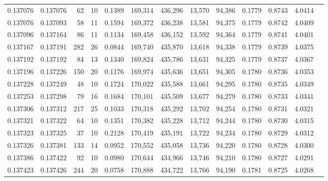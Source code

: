 \begin{tabular}{rrrrrrrrrrrrr}
0.137076 & 0.137076 &    62 &  10 &                                     0.1389 & 169,314 & 436,296 &  13,570 &  94,386 & 0.1779 & 0.8743 & 4.0414 \\
0.137076 & 0.137093 &    58 &  11 &                                     0.1594 & 169,372 & 436,238 &  13,581 &  94,375 & 0.1779 & 0.8742 & 4.0409 \\
0.137096 & 0.137164 &    86 &  11 &                                     0.1134 & 169,458 & 436,152 &  13,592 &  94,364 & 0.1779 & 0.8741 & 4.0401 \\
0.137167 & 0.137191 &   282 &  26 &                                     0.0844 & 169,740 & 435,870 &  13,618 &  94,338 & 0.1779 & 0.8739 & 4.0375 \\
0.137192 & 0.137192 &    84 &  13 &                                     0.1340 & 169,824 & 435,786 &  13,631 &  94,325 & 0.1779 & 0.8737 & 4.0367 \\
0.137196 & 0.137226 &   150 &  20 &                                     0.1176 & 169,974 & 435,636 &  13,651 &  94,305 & 0.1780 & 0.8736 & 4.0353 \\
0.137228 & 0.137249 &    48 &  10 &                                     0.1724 & 170,022 & 435,588 &  13,661 &  94,295 & 0.1780 & 0.8735 & 4.0349 \\
0.137253 & 0.137298 &    79 &  16 &                                     0.1684 & 170,101 & 435,509 &  13,677 &  94,279 & 0.1780 & 0.8733 & 4.0341 \\
0.137306 & 0.137312 &   217 &  25 &                                     0.1033 & 170,318 & 435,292 &  13,702 &  94,254 & 0.1780 & 0.8731 & 4.0321 \\
0.137321 & 0.137322 &    64 &  10 &                                     0.1351 & 170,382 & 435,228 &  13,712 &  94,244 & 0.1780 & 0.8730 & 4.0315 \\
0.137323 & 0.137325 &    37 &  10 &                                     0.2128 & 170,419 & 435,191 &  13,722 &  94,234 & 0.1780 & 0.8729 & 4.0312 \\
0.137326 & 0.137381 &   133 &  14 &                                     0.0952 & 170,552 & 435,058 &  13,736 &  94,220 & 0.1780 & 0.8728 & 4.0300 \\
0.137386 & 0.137422 &    92 &  10 &                                     0.0980 & 170,644 & 434,966 &  13,746 &  94,210 & 0.1780 & 0.8727 & 4.0291 \\
0.137423 & 0.137426 &   244 &  20 &                                     0.0758 & 170,888 & 434,722 &  13,766 &  94,190 & 0.1781 & 0.8725 & 4.0268 \\

\end{tabular}

